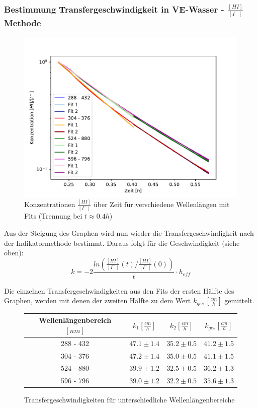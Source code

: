 \documentclass[12pt]{article}
\begin{document}
\subsubsection{Bestimmung Transfergeschwindigkeit in VE-Wasser - $\frac{[HI]}{[I^-]}$ Methode}
\begin{figure}[H]
	\centering
	\includegraphics[width=120mm]{VE-Wasser/TransferhIKnick}
	\caption{Konzentrationen $\frac{[HI]}{[I^-]}$ über Zeit für verschiedene Wellenlängen mit Fits (Trennung bei $t \approx 0.4h$)}
\end{figure}

Aus der Steigung des Graphen wird nun wieder die Transfergeschwindigkeit nach der Indikatormethode bestimmt.
Daraus folgt für die Geschwindigkeit (siehe oben):
\begin{equation}
k = -2 \frac{ln(\frac{[HI]}{[I^-]}(t)/\frac{[HI]}{[I^-]}(0))}{t} \cdot h_{eff}
\end{equation}

Die einzelnen Transfergeschwindigkeiten aus den Fits der ersten Hälfte des Graphen, werden mit denen der zweiten Hälfte zu dem Wert $k_{ges} \, [\frac{cm}{h}]$ gemittelt.

\begin{figure}[H]
	\centering
	\begin{tabular}{c|c|c|c}
		Wellenlängenbereich $[nm]$ & $k_1 [\frac{cm}{h}]$ & $k_2 [\frac{cm}{h}]$ & $k_{ges} [\frac{cm}{h}] $ \\ \hline
		288 - 432 & $47.1 \pm 1.4$ & $35.2 \pm 0.5$ & $41.2 \pm 1.5$ \\
		304 - 376 & $47.2 \pm 1.4$ & $35.0 \pm 0.5$ & $41.1 \pm 1.5$ \\
		524 - 880 & $39.9 \pm 1.2$ & $32.5 \pm 0.5$ & $36.2 \pm 1.3$ \\
    	596 - 796 & $39.0 \pm 1.2$ & $32.2 \pm 0.5$ & $35.6 \pm 1.3$
	\end{tabular}
	\caption{Transfergeschwindigkeiten für unterschiedliche Wellenlängenbereiche}
\end{figure}
\end{document}
